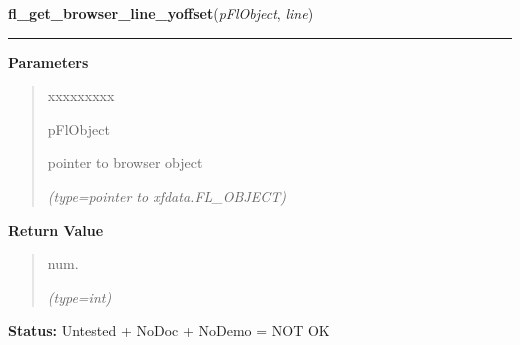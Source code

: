 \hspace{.8\funcindent}\begin{boxedminipage}{\funcwidth}

    \raggedright \textbf{fl\_get\_browser\_line\_yoffset}(\textit{pFlObject}, \textit{line})

    \vspace{-1.5ex}

    \rule{\textwidth}{0.5\fboxrule}
\setlength{\parskip}{2ex}
\setlength{\parskip}{1ex}
      \textbf{Parameters}
      \vspace{-1ex}

      \begin{quote}
        \begin{Ventry}{xxxxxxxxx}

          \item[pFlObject]

          pointer to browser object

            {\it (type=pointer to xfdata.FL\_OBJECT)}

        \end{Ventry}

      \end{quote}

      \textbf{Return Value}
    \vspace{-1ex}

      \begin{quote}
      num.

      {\it (type=int)}

      \end{quote}

\textbf{Status:} Untested + NoDoc + NoDemo = NOT OK



    \end{boxedminipage}

    \label{xformslib:flbrowser:fl_get_browser_hscroll_callback}

    \vspace{0.5ex}


